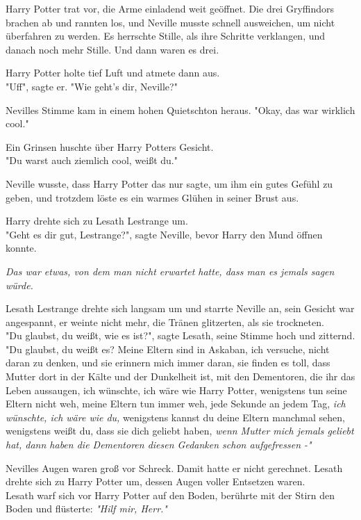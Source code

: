 {Harry Potter trat vor, die Arme einladend weit geöffnet. Die drei Gryffindors brachen ab und rannten los, und Neville musste schnell ausweichen, um nicht überfahren zu werden. Es herrschte Stille, als ihre Schritte verklangen, und danach noch mehr Stille. Und dann waren es drei.

Harry Potter holte tief Luft und atmete dann aus.\\ "Uff", sagte er. "Wie geht's dir, Neville?"

Nevilles Stimme kam in einem hohen Quietschton heraus. "Okay, das war wirklich cool."

Ein Grinsen huschte über Harry Potters Gesicht.\\ "Du warst auch ziemlich cool, weißt du."

Neville wusste, dass Harry Potter das nur sagte, um ihm ein gutes Gefühl zu geben, und trotzdem löste es ein warmes Glühen in seiner Brust aus.

Harry drehte sich zu Lesath Lestrange um.\\ "Geht es dir gut, Lestrange?", sagte Neville, bevor Harry den Mund öffnen konnte.

\emph{Das war etwas, von dem man nicht erwartet hatte, dass man es jemals sagen würde.}

Lesath Lestrange drehte sich langsam um und starrte Neville an, sein Gesicht war angespannt, er weinte nicht mehr, die Tränen glitzerten, als sie trockneten.\\ "Du glaubst, du weißt, wie es ist?", sagte Lesath, seine Stimme hoch und zitternd.\\ "Du glaubst, du weißt es? Meine Eltern sind in Askaban, ich versuche, nicht daran zu denken, und sie erinnern mich immer daran, sie finden es toll, dass Mutter dort in der Kälte und der Dunkelheit ist, mit den Dementoren, die ihr das Leben aussaugen, ich wünschte, ich wäre wie Harry Potter, wenigstens tun seine Eltern nicht weh, meine Eltern tun immer weh, jede Sekunde an jedem Tag, \emph{ich wünschte, ich wäre wie du,} wenigstens kannst du deine Eltern manchmal sehen, wenigstens weißt du, dass sie dich geliebt haben, \emph{wenn Mutter mich jemals geliebt hat, dann haben die Dementoren diesen Gedanken schon aufgefressen -"}

Nevilles Augen waren groß vor Schreck. Damit hatte er nicht gerechnet. Lesath drehte sich zu Harry Potter um, dessen Augen voller Entsetzen waren.\\ Lesath warf sich vor Harry Potter auf den Boden, berührte mit der Stirn den Boden und flüsterte: \emph{"Hilf mir, Herr."}

}
